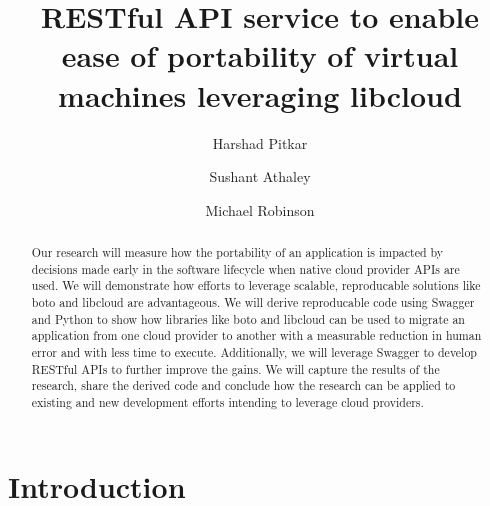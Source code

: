 
\title{RESTful API service to enable ease of portability of virtual
machines leveraging libcloud}


\author{Harshad Pitkar}

\author{Sushant Athaley}

\author{Michael Robinson}


\renewcommand{\shortauthors}{H. Pitkar, S. Athaley, M. Robinson}


\begin{abstract}
Our research will measure how the portability of an application is
impacted by decisions made early in the software lifecycle when native
cloud provider APIs are used. We will demonstrate how efforts to
leverage scalable, reproducable solutions like boto and libcloud are
advantageous. We will derive reproducable code using Swagger and Python
to show how libraries like boto and libcloud can be used to migrate an
application from one cloud provider to another with a measurable
reduction in human error and with less time to execute. Additionally, we
will leverage Swagger to develop RESTful APIs to further improve the
gains. We will capture the results of the research, share the derived
code and conclude how the research can be applied to existing and new
development efforts intending to leverage cloud providers. 
\end{abstract}



\maketitle

\section{Introduction}\label{introduction}

